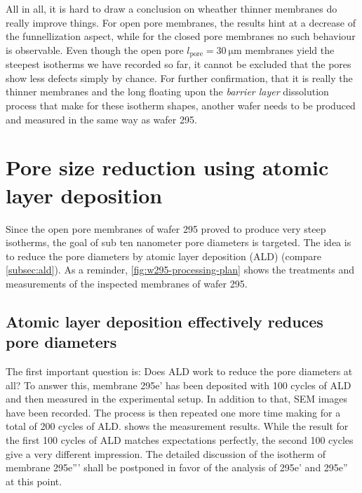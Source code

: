 \documentclass[../thesis.tex]{subfiles}
\begin{document}
    All in all, it is hard to draw a conclusion on wheather thinner membranes do really improve things. For open pore membranes, the results hint at a decrease of the funnellization aspect, while for the closed pore membranes no such behaviour is observable. Even though the open pore $l_\mathrm{pore}=\SI{30}{\micro\meter}$ membranes yield the steepest isotherms we have recorded so far, it cannot be excluded that the pores show less defects simply by chance. For further confirmation, that it is really the thinner membranes and the long floating upon the \textit{barrier layer} dissolution process that make for these isotherm shapes, another wafer needs to be produced and measured in the same way as wafer 295.


  \section{Pore size reduction using atomic layer deposition}
  \label{sec:ald-experiments}

    Since the open pore membranes of wafer 295 proved to produce very steep isotherms, the goal of sub ten nanometer pore diameters is targeted. The idea is to reduce the pore diameters by atomic layer deposition (ALD) (compare \cref{subsec:ald}). As a reminder, \cref{fig:w295-processing-plan} shows the treatments and measurements of the inspected membranes of wafer 295.

    


    \subsection{Atomic layer deposition effectively reduces pore diameters}
    \label{subsec:ald-reduces-diameters}

      The first important question is: Does ALD work to reduce the pore diameters at all? To answer this, membrane 295e' has been deposited with 100 cycles of ALD and then measured in the experimental setup. In addition to that, SEM images have been recorded. The process is then repeated one more time making for a total of 200 cycles of ALD.   shows the measurement results. While the result for the first 100 cycles of ALD matches expectations perfectly, the second 100 cycles give a very different impression. The detailed discussion of the isotherm of membrane 295e''' shall be postponed in favor of the analysis of 295e' and 295e'' at this point.
\end{document}

